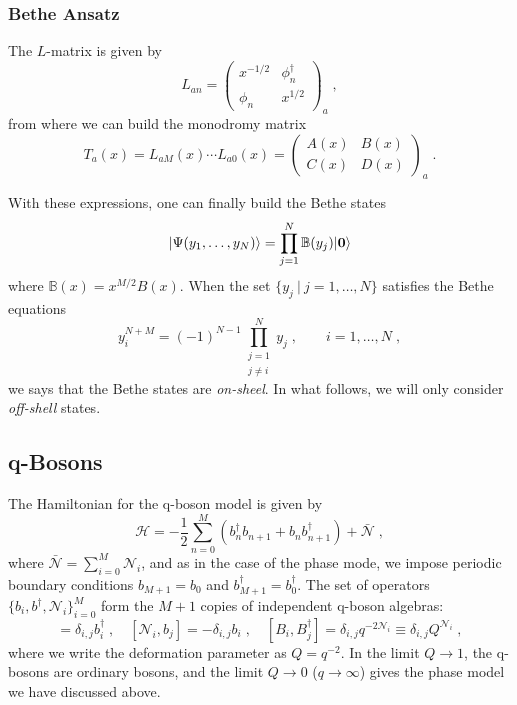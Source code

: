\documentclass[a4paper,11pt]{amsart}
\begin{document}
\subsubsection{Bethe Ansatz}
The \(L\)-matrix is given by 
\begin{equation}
  L_{an} = 
\begin{pmatrix}
x^{ - 1/2} & \phi_n^\dagger \\ \phi_n & x^{1/2}
\end{pmatrix}_a\; , 
\end{equation}
from where we can build the monodromy matrix 
\begin{equation}
  T_a(x) = L_{aM}(x) \cdots L_{a0}(x) = 
\begin{pmatrix}
A(x) & B(x) \\ C(x) & D(x)
\end{pmatrix}_a\; .
\end{equation}

With these expressions, one can finally build the Bethe states
\begin{equation}
  \lvert\Psi(y_1, \dots, y_N)\rangle = \prod_{j=1}^N \mathbb{B}(y_j) \lvert\bm{0}\rangle
\end{equation}
where \(\mathbb{B}(x) = x^{M/2} B(x)\). When the set \(\{ y_j \ | \ j
=1, \dots , N\}\) satisfies the Bethe equations
\begin{equation}
  y^{N + M}_i = (-1)^{N-1} \prod_{\substack{j = 1 \\ j \neq i}}^N y_j\; , \qquad i = 1, \dots, N\; , 
\end{equation}
we says that the Bethe states are \emph{on-sheel}. In what follows, we will 
only consider \emph{off-shell} states. 


\subsection{q-Bosons}
The Hamiltonian for the q-boson model is
given by
\begin{equation}
  \mathcal{H} = -\frac{1}{2} \sum_{n=0}^M
  \left(b_n^\dagger b_{n+1} + b_n b_{n+1}^\dagger \right) + \bar{\mathcal{N}}\; ,
\end{equation}
where \(\bar{\mathcal{N}} = \sum_{i=0}^M \mathcal{N}_i\), and as in
the case of the phase mode, we impose periodic boundary conditions
\(b_{M+1} = b_0\) and \(b_{M+1}^\dagger = b_0^\dagger\). The set of
operators \(\{b_i, b^\dagger,\mathcal{N}_i\}_{i=0}^M\) form the
\(M+1\) copies of independent q-boson algebras:
\begin{equation}
[\mathcal{N}_i, b_j^\dagger]=\delta_{i,j} b_i^\dagger\; , \quad 
[\mathcal{N}_i, b_j]=-\delta_{i,j}b_i\; , \quad
[B_i, B_j^\dagger]= \delta_{i,j} q^{-2\mathcal{N}_i}  \equiv \delta_{i,j} Q^{\mathcal{N}_i}\; , 
\end{equation}
where we write the deformation parameter as \(Q = q^{-2}\). 
In the limit \(Q\to 1\), the q-bosons are ordinary bosons, and 
the limit \(Q\to 0\) (\(q\to \infty\)) gives the phase model we have discussed above. 
\end{document}
